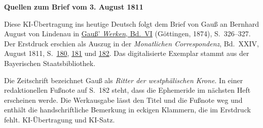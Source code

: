 \clearpage\thispagestyle{empty}
\begin{center}\textbf{Quellen zum Brief vom 3. August 1811}\end{center}
\noindent Diese KI-Übertragung ins heutige Deutsch folgt dem Brief von Gauß an Bernhard August von Lindenau in \href{https://gdz.sub.uni-goettingen.de/id/PPN236007467}{Gauß’ \textit{Werken}, Bd.~VI} (Göttingen, 1874), S.~326--327. Der Erstdruck erschien als Auszug in der \textit{Monatlichen Correspondenz}, Bd.~XXIV, August 1811, S.~\href{https://api.digitale-sammlungen.de/iiif/image/v2/bsb10538613_00190/full/1600,/0/default.jpg}{180}, \href{https://api.digitale-sammlungen.de/iiif/image/v2/bsb10538613_00191/full/1600,/0/default.jpg}{181} und \href{https://api.digitale-sammlungen.de/iiif/image/v2/bsb10538613_00192/full/1600,/0/default.jpg}{182}. Das digitalisierte Exemplar stammt aus der Bayerischen Staatsbibliothek.
\par\smallskip\noindent Die Zeitschrift bezeichnet Gauß als \textit{Ritter der westphälischen Krone}. In einer redaktionellen Fußnote auf S.~182 steht, dass die Ephemeride im nächsten Heft erscheinen werde. Die Werkausgabe lässt den Titel und die Fußnote weg und enthält die handschriftliche Bemerkung in eckigen Klammern, die im Erstdruck fehlt. KI-Übertragung und KI-Satz.
\clearpage

